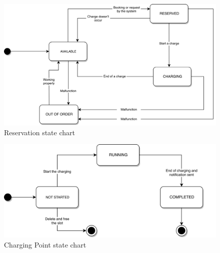 \begin{figure}[h]
      \centering
      \includegraphics[scale=0.2]{src/state_diagram/cp.png}
      \caption{Reservation state chart}
\end{figure}
\begin{figure}[H]
      \centering
      \includegraphics[scale=0.2]{src/state_diagram/transaction.png}
      \caption{Charging Point state chart}
\end{figure} \vspace{1cm}

